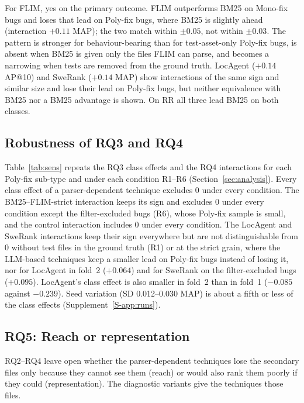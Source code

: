 \documentclass[a4paper,fleqn]{cas-dc}
\newcommand{\mono}{Mono-fix\xspace}
\newcommand{\poly}{Poly-fix\xspace}
\begin{document}
\begin{tcolorbox}[title=Answer to RQ4]
For FLIM, yes on the primary outcome. FLIM outperforms BM25 on \mono bugs and
loses that lead on \poly bugs, where BM25 is slightly ahead (interaction
$+0.11$ MAP); the two match within $\pm0.05$, not within $\pm0.03$. The
pattern is stronger for behaviour-bearing than for test-asset-only \poly bugs,
is absent when BM25 is
given only the files FLIM can parse, and becomes a narrowing when tests are
removed from the ground truth. LocAgent ($+0.14$ AP@10) and SweRank ($+0.14$
MAP) show interactions of the same sign and similar size and lose their lead
on \poly bugs, but neither
equivalence with BM25 nor a BM25 advantage is shown. On RR all three lead BM25
on both classes.
\end{tcolorbox}

\subsection{Robustness of RQ3 and RQ4}\label{sec:robust}

Table~\ref{tab:sens} repeats the RQ3 class effects and the RQ4 interactions
for each Poly-fix sub-type and under each condition R1--R6
(Section~\ref{sec:analysis}). Every class effect of a parser-dependent
technique excludes 0 under every condition. The BM25--FLIM-strict interaction
keeps its sign and excludes 0 under every condition except the filter-excluded
bugs (R6), whose Poly-fix sample is small, and the control interaction
includes 0 under every condition. The LocAgent and SweRank interactions keep
their sign everywhere but are not distinguishable from 0 without test files in
the ground truth (R1) or at the strict grain, where the LLM-based techniques
keep a smaller lead on Poly-fix bugs instead of losing it, nor for LocAgent in
fold~2 ($+0.064$) and for SweRank on the filter-excluded bugs ($+0.095$).
LocAgent's class effect is also smaller in fold~2 than in fold~1 ($-0.085$
against $-0.239$). Seed variation (SD 0.012--0.030 MAP) is about a fifth or
less of the class effects (Supplement~\ref{S-app:runs}).



\subsection{RQ5: Reach or representation}\label{sec:variants}

RQ2--RQ4 leave open whether the parser-dependent techniques lose the
secondary files only because they cannot see them (reach) or would also rank
them poorly if they could (representation). The diagnostic variants give the
techniques those files.
\end{document}
